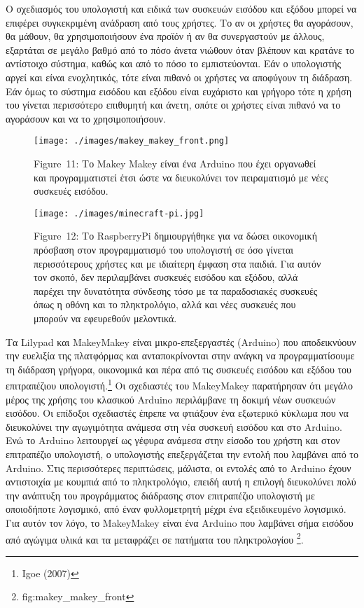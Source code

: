 \documentclass[
]{article}
\begin{document}
O σχεδιασμός του υπολογιστή και ειδικά των συσκευών εισόδου και εξόδου
μπορεί να επιφέρει συγκεκριμένη ανάδραση από τους χρήστες. Το αν οι
χρήστες θα αγοράσουν, θα μάθουν, θα χρησιμοποιήσουν ένα προϊόν ή αν θα
συνεργαστούν με άλλους, εξαρτάται σε μεγάλο βαθμό από το πόσο άνετα
νιώθουν όταν βλέπουν και κρατάνε το αντίστοιχο σύστημα, καθώς και από το
πόσο το εμπιστεύονται. Εάν ο υπολογιστής αργεί και είναι ενοχλητικός,
τότε είναι πιθανό οι χρήστες να αποφύγουν τη διάδραση. Εάν όμως το
σύστημα εισόδου και εξόδου είναι ευχάριστο και γρήγορο τότε η χρήση του
γίνεται περισσότερο επιθυμητή και άνετη, οπότε οι χρήστες είναι πιθανό
να το αγοράσουν και να το χρησιμοποιήσουν.

\leavevmode{}%
\begin{figure}
\hypertarget{fig:makey_makey_front}{%
\centering
\texttt{[image: ./images/makey\_makey\_front.png]}
\caption{Figure~11: Το Makey Makey είναι ένα Arduino που έχει οργανωθεί
και προγραμματιστεί έτσι ώστε να διευκολύνει τον πειραματισμό με νέες
συσκευές εισόδου.}\label{fig:makey_makey_front}
}
\end{figure}

\leavevmode{}%
\begin{figure}
\hypertarget{fig:minecraft-pi}{%
\centering
\texttt{[image: ./images/minecraft-pi.jpg]}
\caption{Figure~12: Το RaspberryPi δημιουργήθηκε για να δώσει οικονομική
πρόσβαση στον προγραμματισμό του υπολογιστή σε όσο γίνεται περισσότερους
χρήστες και με ιδιαίτερη έμφαση στα παιδιά. Για αυτόν τον σκοπό, δεν
περιλαμβάνει συσκευές εισόδου και εξόδου, αλλά παρέχει την δυνατότητα
σύνδεσης τόσο με τα παραδοσιακές συσκευές όπως η οθόνη και το
πληκτρολόγιο, αλλά και νέες συσκευές που μπορούν να εφευρεθούν
μελοντικά.}\label{fig:minecraft-pi}
}
\end{figure}

Τα Lilypad και MakeyMakey είναι μικρο-επεξεργαστές (Arduino) που
αποδεικνύουν την ευελιξία της πλατφόρμας και ανταποκρίνονται στην ανάγκη
να προγραμματίσουμε τη διάδραση γρήγορα, οικονομικά και πέρα από τις
συσκευές εισόδου και εξόδου του επιτραπέζιου υπολογιστή.\footnote{Igoe
  (2007)} Οι σχεδιαστές του MakeyMakey παρατήρησαν ότι μεγάλο μέρος της
χρήσης του κλασικού Arduino περιλάμβανε τη δοκιμή νέων συσκευών εισόδου.
Οι επίδοξοι σχεδιαστές έπρεπε να φτιάξουν ένα εξωτερικό κύκλωμα που να
διευκολύνει την αγωγιμότητα ανάμεσα στη νέα συσκευή εισόδου και στο
Arduino. Ενώ το Arduino λειτουργεί ως γέφυρα ανάμεσα στην είσοδο του
χρήστη και στον επιτραπέζιο υπολογιστή, ο υπολογιστής επεξεργάζεται την
εντολή που λαμβάνει από το Arduino. Στις περισσότερες περιπτώσεις,
μάλιστα, οι εντολές από το Arduino έχουν αντιστοιχία με κουμπιά από το
πληκτρολόγιο, επειδή αυτή η επιλογή διευκολύνει πολύ την ανάπτυξη του
προγράμματος διάδρασης στον επιτραπέζιο υπολογιστή με οποιοδήποτε
λογισμικό, από έναν φυλλομετρητή μέχρι ένα εξειδικευμένο λογισμικό. Για
αυτόν τον λόγο, το MakeyMakey είναι ένα Arduino που λαμβάνει σήμα
εισόδου από αγώγιμα υλικά και τα μεταφράζει σε πατήματα του
πληκτρολογίου \footnote{fig:makey\_makey\_front}.
\end{document}
